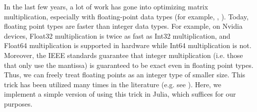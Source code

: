 





In the last few years, a lot of work has gone into optimizing matrix multiplication,
especially with floating-point data types
(for example, \cite{nvidia-2024-cublas}, \cite{openblas-2024-openblas}). 
Today, floating point types are faster than
integer data types.
For example, on Nvidia devices, Float32 multiplication
is twice as fast as Int32 multiplication, and Float64
multiplication is supported in hardware while Int64 multiplication
is not.
Moreover, the IEEE standards guarantee that integer multiplication (i.e. those that only use the mantissa) 
is guaranteed to be exact even in floating point types. 
Thus, we can freely treat floating points as an integer type of smaller size.
This trick has been utilized many times in the literature (e.g. see \cite{bglm-2024-matmul-modp}).
Here, we implement a simple version of using this trick in Julia,
which suffices for our purposes.

